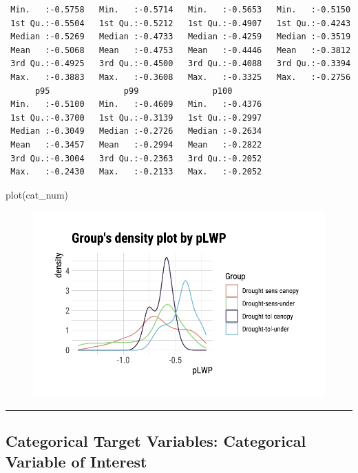 \documentclass[
  letterpaper,
  DIV=11,
  numbers=noendperiod]{scrreprt}
\newenvironment{Shaded}{\begin{snugshade}}{\end{snugshade}}
\newcommand{\FunctionTok}[1]{\textcolor[rgb]{0.28,0.35,0.67}{#1}}
\newcommand{\NormalTok}[1]{\textcolor[rgb]{0.00,0.23,0.31}{#1}}
\begin{document}
\begin{verbatim}
 Min.   :-0.5758   Min.   :-0.5714   Min.   :-0.5653   Min.   :-0.5150  
 1st Qu.:-0.5504   1st Qu.:-0.5212   1st Qu.:-0.4907   1st Qu.:-0.4243  
 Median :-0.5269   Median :-0.4733   Median :-0.4259   Median :-0.3519  
 Mean   :-0.5068   Mean   :-0.4753   Mean   :-0.4446   Mean   :-0.3812  
 3rd Qu.:-0.4925   3rd Qu.:-0.4500   3rd Qu.:-0.4088   3rd Qu.:-0.3394  
 Max.   :-0.3883   Max.   :-0.3608   Max.   :-0.3325   Max.   :-0.2756  
      p95               p99               p100        
 Min.   :-0.5100   Min.   :-0.4609   Min.   :-0.4376  
 1st Qu.:-0.3700   1st Qu.:-0.3139   1st Qu.:-0.2997  
 Median :-0.3049   Median :-0.2726   Median :-0.2634  
 Mean   :-0.3457   Mean   :-0.2994   Mean   :-0.2822  
 3rd Qu.:-0.3004   3rd Qu.:-0.2363   3rd Qu.:-0.2052  
 Max.   :-0.2430   Max.   :-0.2133   Max.   :-0.2052  
\end{verbatim}

\begin{Shaded}
\begin{Highlighting}[]
\FunctionTok{plot}\NormalTok{(cat\_num) }
\end{Highlighting}
\end{Shaded}

\begin{figure}[H]

{\centering \includegraphics{./CorrelateLikeDataMaster_files/figure-pdf/unnamed-chunk-12-1.pdf}

}

\end{figure}

\begin{center}\rule{0.5\linewidth}{0.5pt}\end{center}

\hypertarget{categorical-target-variables-categorical-variable-of-interest}{%
\subsection{Categorical Target Variables: Categorical Variable of
Interest}\label{categorical-target-variables-categorical-variable-of-interest}}
\end{document}
